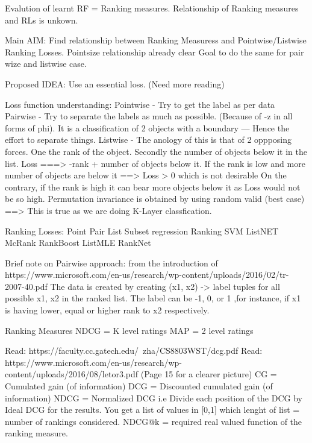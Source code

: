 \documentclass[12pt, twoside, ngerman]{report}
\begin{document}
Evalution of learnt RF = Ranking measures.
Relationship of Ranking measures and RLs is unkown.


Main AIM:
    Find relationship between Ranking Measuress and Pointwise/Listwise Ranking Losses.
    Pointsize relationship already clear
    Goal to do the same for pair wize and listwise case.

Proposed IDEA:
    Use an essential loss. (Need more reading)

Loss function understanding:
Pointwise - Try to get the label as per data
Pairwise - Try to separate the labels as much as possible. (Because of -z in all forms of phi).
           It is a classification of 2 objects with a boundary --- Hence the effort to separate things.
Listwise - The anology of this is that of 2 oppposing forces. One the rank of the object. Secondly
           the number of objects below it in the list.
           Loss ===> -rank + number of objects below it.
                If the rank is low and more number of objects are below it ==> Loss > 0 which is not desirable
                On the contrary, if the rank is high it can bear more objects below it as Loss would not be so high.
           Permutation invariance is obtained by using random valid (best case)
        ==> This is true as we are doing K-Layer classfication.


Ranking Losses:
    Point               Pair            List
    Subset regression   Ranking SVM     ListNET
    McRank              RankBoost       ListMLE
                        RankNet

Brief note on Pairwise approach: from the introduction of https://www.microsoft.com/en-us/research/wp-content/uploads/2016/02/tr-2007-40.pdf
    The data is created by creating (x1, x2) -> label tuples for all possible x1, x2 in the ranked list. The label can be -1, 0, or 1
    ,for instance, if x1 is having lower, equal or higher rank to x2 respectively.

Ranking Measures
    NDCG = K level ratings
    MAP = 2 level ratings

    Read: https://faculty.cc.gatech.edu/~zha/CS8803WST/dcg.pdf
    Read: https://www.microsoft.com/en-us/research/wp-content/uploads/2016/08/letor3.pdf (Page 15 for a clearer picture)
        CG = Cumulated gain (of information)
        DCG = Discounted cumulated gain (of information)
        NDCG = Normalized DCG i.e Divide each position of the DCG by Ideal DCG for the results.
               You get a list of values in [0,1] which lenght of list = number of rankings considered.
        NDCG@k = required real valued function of the ranking measure.
\end{document}
